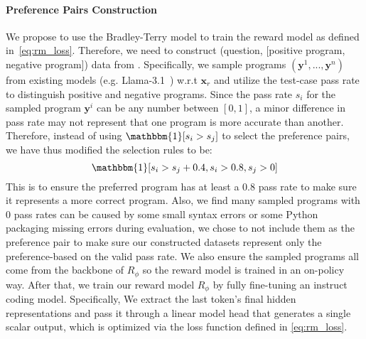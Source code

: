 \paragraph{Preference Pairs Construction}
\label{subsecp:pref_pair_construction}
We propose to use the Bradley-Terry model to train the reward model as defined in~\autoref{eq:rm_loss}. Therefore, we need to construct (question, [positive program, negative program]) data from \dataset{}. Specifically, we sample programs $(\mathbf{y}^1,...,\mathbf{y}^n)$ from existing models (e.g. Llama-3.1~\citep{grattafiori2024llama3herdmodels}) w.r.t $\mathbf{x}_r$ and utilize the test-case pass rate to distinguish positive and negative programs. Since the pass rate $s_i$ for the sampled program $\mathbf{y}^i$ can be any number between $[0,1]$, a minor difference in pass rate may not represent that one program is more accurate than another. Therefore, instead of using $\mathbbm{1}[s_i>s_j]$ to select the preference pairs, we have thus modified the selection rules to be:
\begin{equation}
\label{eq:pref_pair_sel}
    \mathbbm{1}[s_i>s_j+0.4,s_i>0.8,s_j>0]
\end{equation}
This is to ensure the preferred program has at least a $0.8$ pass rate to make sure it represents a more correct program. Also, we find many sampled programs with 0 pass rates can be caused by some small syntax errors or some Python packaging missing errors during evaluation, we chose to not include them as the preference pair to make sure our constructed datasets represent only the preference-based on the valid pass rate. We also ensure the sampled programs all come from the backbone of $R_\phi$ so the reward model is trained in an on-policy way. After that, we train our reward model $R_\phi$ by fully fine-tuning an instruct coding model. Specifically, We extract the last token's final hidden representations and pass it through a linear model head that generates a single scalar output, which is optimized via the loss function defined in \autoref{eq:rm_loss}.